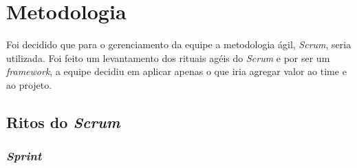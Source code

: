 \chapter[Metodologia]{Metodologia}

Foi decidido que para o gerenciamento da equipe a metodologia ágil, \emph{Scrum}, seria utilizada. Foi feito um levantamento dos rituais agéis do \emph{Scrum}
e por ser um \emph{framework}, a equipe decidiu em aplicar apenas o que iria agregar valor ao time e ao projeto.

\section{Ritos do \emph{Scrum}}

\subsection{\emph{Sprint}}

